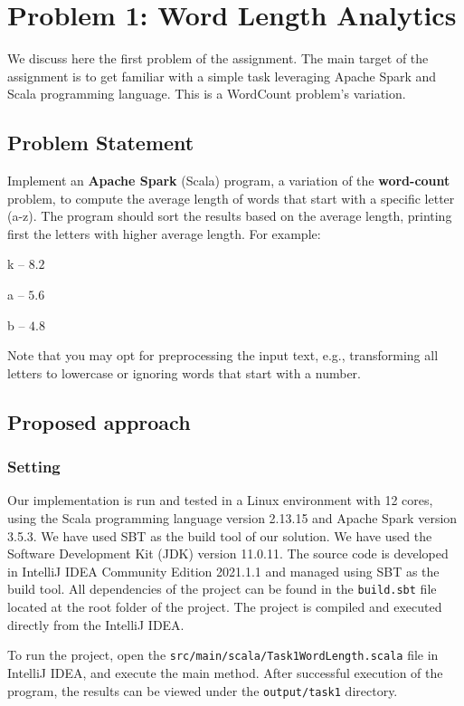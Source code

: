 \documentclass[acmlarge]{acmart}
\begin{document}
\section{Problem 1: Word Length Analytics}
\label{sec:problem1}
We discuss here the first problem of the assignment.
The main target of the assignment is to get familiar with a simple task leveraging Apache Spark and Scala programming language. This is a WordCount problem's variation.

\subsection{Problem Statement}
Implement an \textbf{Apache Spark} (Scala) program, a variation of the \textbf{word-count} problem, to compute the average length of words that start with a specific letter (a-z). The program should sort the results based on the average length, printing first the letters with higher average length. For example:
\begin{description}
  \item k – $8.2$
  \item a – $5.6$
  \item b – $4.8$
\end{description}
Note that you may opt for preprocessing the input text, e.g., transforming all letters to lowercase or ignoring words that start with a number.

\subsection{Proposed approach}
\subsubsection{Setting}
Our implementation is run and tested in a Linux environment with 12 cores, using the Scala programming language version 2.13.15 and Apache Spark version 3.5.3. We have used SBT as the build tool of our solution.
We have used the Software Development Kit (JDK) version 11.0.11.
The source code is developed in IntelliJ IDEA Community Edition 2021.1.1 and managed using SBT as the build tool. All dependencies of the project can be found in the \texttt{build.sbt} file located at the root folder of the project.
The project is compiled and executed directly from the IntelliJ IDEA.

To run the project, open the \texttt{src/main/scala/Task1WordLength.scala} file in IntelliJ IDEA, and execute the main method. After successful execution of the program, the results can be viewed under the \texttt{output/task1} directory.
\end{document}
